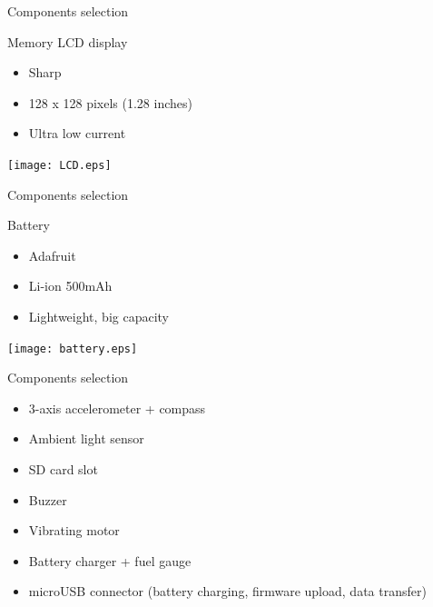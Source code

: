 \documentclass[compress,red]{beamer}
\begin{document}
\begin{frame}{Components selection}

  Memory LCD display

  \begin{itemize}
  \item Sharp
  \item 128 x 128 pixels (1.28 inches)
  \item Ultra low current
  \end{itemize}

  \begin{center}
    \texttt{[image: LCD.eps]}
  \end{center}

  \note[item]{}

\end{frame}

\begin{frame}{Components selection}

  Battery

  \begin{itemize}
  \item Adafruit
  \item Li-ion 500mAh
  \item Lightweight, big capacity
  \end{itemize}

  \begin{center}
    \texttt{[image: battery.eps]}
  \end{center}

\end{frame}

\begin{frame}{Components selection}

  \begin{itemize}
  \item 3-axis accelerometer + compass
  \item Ambient light sensor
  \item SD card slot
  \item Buzzer
  \item Vibrating motor
  \item Battery charger + fuel gauge
  \item microUSB connector (battery charging, firmware upload, data transfer)
  \end{itemize}

  \begin{center}
  \end{center}


\end{frame}
\end{document}
